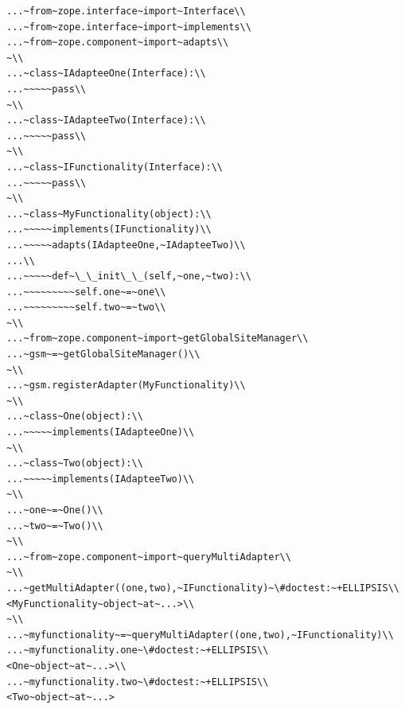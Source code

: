 \documentclass[a4paper,openany,twoside,draft]{book}
\begin{document}
\begin{verbatim}
...~from~zope.interface~import~Interface\\
...~from~zope.interface~import~implements\\
...~from~zope.component~import~adapts\\
~\\
...~class~IAdapteeOne(Interface):\\
...~~~~~pass\\
~\\
...~class~IAdapteeTwo(Interface):\\
...~~~~~pass\\
~\\
...~class~IFunctionality(Interface):\\
...~~~~~pass\\
~\\
...~class~MyFunctionality(object):\\
...~~~~~implements(IFunctionality)\\
...~~~~~adapts(IAdapteeOne,~IAdapteeTwo)\\
...\\
...~~~~~def~\_\_init\_\_(self,~one,~two):\\
...~~~~~~~~~self.one~=~one\\
...~~~~~~~~~self.two~=~two\\
~\\
...~from~zope.component~import~getGlobalSiteManager\\
...~gsm~=~getGlobalSiteManager()\\
~\\
...~gsm.registerAdapter(MyFunctionality)\\
~\\
...~class~One(object):\\
...~~~~~implements(IAdapteeOne)\\
~\\
...~class~Two(object):\\
...~~~~~implements(IAdapteeTwo)\\
~\\
...~one~=~One()\\
...~two~=~Two()\\
~\\
...~from~zope.component~import~queryMultiAdapter\\
~\\
...~getMultiAdapter((one,two),~IFunctionality)~\#doctest:~+ELLIPSIS\\
<MyFunctionality~object~at~...>\\
~\\
...~myfunctionality~=~queryMultiAdapter((one,two),~IFunctionality)\\
...~myfunctionality.one~\#doctest:~+ELLIPSIS\\
<One~object~at~...>\\
...~myfunctionality.two~\#doctest:~+ELLIPSIS\\
<Two~object~at~...>
\end{verbatim}
\end{document}
